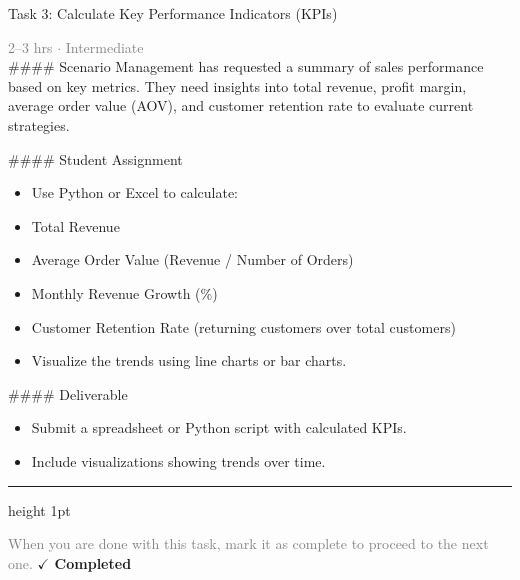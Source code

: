 \documentclass[10pt,a4paper]{article}
\begin{document}
\begin{taskbox}{Task 3: Calculate Key Performance Indicators (KPIs)}

    {\small \textcolor{gray}{2--3 hrs $\cdot$ Intermediate}}\\[12pt]

    \#\#\#\# Scenario  
Management has requested a summary of sales performance based on key metrics. They need insights into total revenue, profit margin, average order value (AOV), and customer retention rate to evaluate current strategies.  

\#\#\#\# Student Assignment  
\begin{itemize}
    \item Use Python or Excel to calculate:  
    \item Total Revenue  
    \item Average Order Value (Revenue / Number of Orders)  
    \item Monthly Revenue Growth (\%)  
    \item Customer Retention Rate (returning customers over total customers)  
    \item Visualize the trends using line charts or bar charts.  
\end{itemize}

\#\#\#\# Deliverable  
\begin{itemize}
    \item Submit a spreadsheet or Python script with calculated KPIs.  
    \item Include visualizations showing trends over time.\par
\end{itemize}

    \vspace{16pt}

    \textcolor{cardBorder}{\hrule height 1pt}\vspace{8pt}

    \small \textcolor{gray}{When you are done with this task, mark it as complete to proceed to the next one.} \hfill \textbf{\textcolor{brandDark}{$\checkmark$ Completed}}

\end{taskbox}
\end{document}
